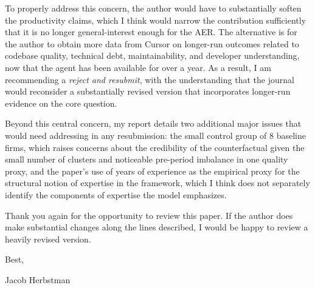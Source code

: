 \documentclass{article}
\begin{document}
To properly address this concern, the author would have to substantially soften the productivity claims, which I think would narrow the contribution sufficiently that it is no longer general-interest enough for the AER.
The alternative is for the author to obtain more data from Cursor on longer-run outcomes related to codebase quality, technical debt, maintainability, and developer understanding, now that the agent has been available for over a year.
As a result, I am recommending a \textit{reject and resubmit}, with the understanding that the journal would reconsider a substantially revised version that incorporates longer-run evidence on the core question.

Beyond this central concern, my report details two additional major issues that would need addressing in any resubmission: the small control group of 8 baseline firms, which raises concerns about the credibility of the counterfactual given the small number of clusters and noticeable pre-period imbalance in one quality proxy, and the paper's use of years of experience as the empirical proxy for the structural notion of expertise in the framework, which I think does not separately identify the components of expertise the model emphasizes.

Thank you again for the opportunity to review this paper.
If the author does make substantial changes along the lines described, I would be happy to review a heavily revised version.

\vspace{0.5cm}

Best,

Jacob Herbstman
\end{document}
